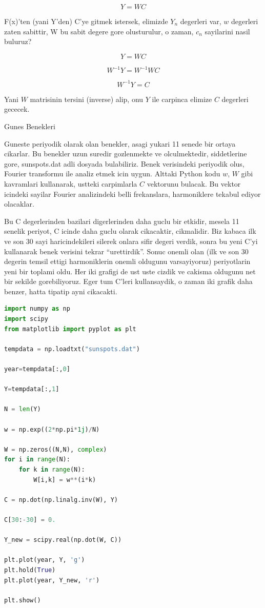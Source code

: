 \documentclass[12pt,fleqn]{article}
\begin{document}
\[ Y = WC \]

F(x)'ten (yani Y'den) C'ye gitmek istersek, elimizde $Y_n$ degerleri var, $w$
degerleri zaten sabittir, W bu sabit degere gore olusturulur, o zaman, $c_n$
sayilarini nasil buluruz?

\[ Y = WC  \]

\[ W^{-1}Y = W^{-1}WC  \]

\[ W^{-1}Y = C \]

Yani $W$ matrisinin tersini (inverse) alip, onu $Y$ ile carpinca elimize $C$
degerleri gececek. 

Gunes Benekleri

Guneste periyodik olarak olan benekler, asagi yukari 11 senede bir ortaya
cikarlar. Bu benekler uzun suredir gozlenmekte ve olculmektedir, siddetlerine
gore, sunspots.dat adli dosyada bulabiliriz. Benek verisindeki periyodik olus,
Fourier transformu ile analiz etmek icin uygun. Alttaki Python kodu $w$, $W$
gibi kavramlari kullanarak, ustteki carpimlarla $C$ vektorunu bulacak. Bu vektor
icindeki sayilar Fourier analizindeki belli frekanslara, harmoniklere tekabul
ediyor olacaklar.

Bu C degerlerinden bazilari digerlerinden daha guclu bir etkidir, mesela 11
senelik periyot, C icinde daha guclu olarak cikacaktir, cikmalidir. Biz kabaca
ilk ve son 30 sayi haricindekileri silerek onlara sifir degeri verdik, sonra bu
yeni C'yi kullanarak benek verisini tekrar ``urettirdik''. Sonuc onemli olan
(ilk ve son 30 degerin temsil ettigi harmoniklerin onemli oldugunu varsayiyoruz)
periyotlarin yeni bir toplami oldu. Her iki grafigi de ust uste cizdik ve
cakisma oldugunu net bir sekilde gorebiliyoruz. Eger tum C'leri kullansaydik, o
zaman iki grafik daha benzer, hatta tipatip ayni cikacakti.

\begin{lstlisting}[language=Python]
import numpy as np
import scipy
from matplotlib import pyplot as plt

tempdata = np.loadtxt("sunspots.dat")

year=tempdata[:,0]

Y=tempdata[:,1]

N = len(Y)

w = np.exp((2*np.pi*1j)/N)

W = np.zeros((N,N), complex)
for i in range(N):
    for k in range(N):
        W[i,k] = w**(i*k)
        
C = np.dot(np.linalg.inv(W), Y) 

C[30:-30] = 0.

Y_new = scipy.real(np.dot(W, C))

plt.plot(year, Y, 'g')
plt.hold(True)
plt.plot(year, Y_new, 'r')

plt.show()
\end{lstlisting}
\end{document}
